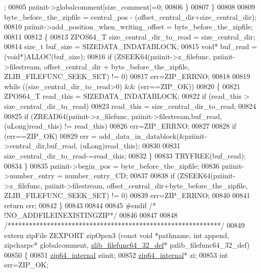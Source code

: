 \begin{DoxyCode}
      ;
00805       pziinit->globalcomment[size\_comment]=0;
00806     \}
00807   \}
00808 
00809   byte\_before\_the\_zipfile = central\_pos - (offset\_central\_dir+size\_central\_dir);
00810   pziinit->add\_position\_when\_writing\_offset = byte\_before\_the\_zipfile;
00811 
00812   \{
00813     ZPOS64\_T size\_central\_dir\_to\_read = size\_central\_dir;
00814     \textcolor{keywordtype}{size\_t} buf\_size = SIZEDATA\_INDATABLOCK;
00815     \textcolor{keywordtype}{void}* buf\_read = (\textcolor{keywordtype}{void}*)ALLOC(buf\_size);
00816     \textcolor{keywordflow}{if} (ZSEEK64(pziinit->z\_filefunc, pziinit->filestream, offset\_central\_dir + byte\_before\_the\_zipfile, 
      ZLIB\_FILEFUNC\_SEEK\_SET) != 0)
00817       err=ZIP\_ERRNO;
00818 
00819     \textcolor{keywordflow}{while} ((size\_central\_dir\_to\_read>0) && (err==ZIP\_OK))
00820     \{
00821       ZPOS64\_T read\_this = SIZEDATA\_INDATABLOCK;
00822       \textcolor{keywordflow}{if} (read\_this > size\_central\_dir\_to\_read)
00823         read\_this = size\_central\_dir\_to\_read;
00824 
00825       \textcolor{keywordflow}{if} (ZREAD64(pziinit->z\_filefunc, pziinit->filestream,buf\_read,(uLong)read\_this) != read\_this)
00826         err=ZIP\_ERRNO;
00827 
00828       \textcolor{keywordflow}{if} (err==ZIP\_OK)
00829         err = add\_data\_in\_datablock(&pziinit->central\_dir,buf\_read, (uLong)read\_this);
00830 
00831       size\_central\_dir\_to\_read-=read\_this;
00832     \}
00833     TRYFREE(buf\_read);
00834   \}
00835   pziinit->begin\_pos = byte\_before\_the\_zipfile;
00836   pziinit->number\_entry = number\_entry\_CD;
00837 
00838   \textcolor{keywordflow}{if} (ZSEEK64(pziinit->z\_filefunc, pziinit->filestream, offset\_central\_dir+byte\_before\_the\_zipfile,
      ZLIB\_FILEFUNC\_SEEK\_SET) != 0)
00839     err=ZIP\_ERRNO;
00840 
00841   \textcolor{keywordflow}{return} err;
00842 \}
00843 
00844 
00845 \textcolor{preprocessor}{#endif }\textcolor{comment}{/* !NO\_ADDFILEINEXISTINGZIP*/}\textcolor{preprocessor}{}
00846 
00847 
00848 \textcolor{comment}{/************************************************************/}
00849 \textcolor{keyword}{extern} zipFile ZEXPORT zipOpen3 (\textcolor{keyword}{const} \textcolor{keywordtype}{void} *pathname, \textcolor{keywordtype}{int} append, zipcharpc* globalcomment, 
      \hyperlink{structzlib__filefunc64__32__def__s}{zlib\_filefunc64\_32\_def}* pzlib\_filefunc64\_32\_def)
00850 \{
00851     \hyperlink{structzip64__internal}{zip64\_internal} ziinit;
00852     \hyperlink{structzip64__internal}{zip64\_internal}* zi;
00853     \textcolor{keywordtype}{int} err=ZIP\_OK;

\end{DoxyCode}
